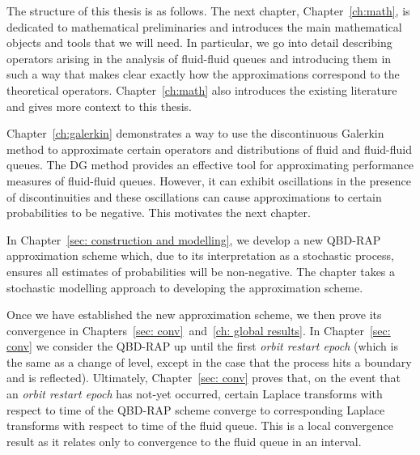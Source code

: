 The structure of this thesis is as follows. The next chapter, Chapter~\ref{ch:math}, is dedicated to mathematical preliminaries and introduces the main mathematical objects and tools that we will need. In particular, we go into detail describing operators arising in the analysis of fluid-fluid queues and introducing them in such a way that makes clear exactly how the approximations correspond to the theoretical operators. %
Chapter~\ref{ch:math} also introduces the existing literature and gives more context to this thesis.

Chapter~\ref{ch:galerkin} demonstrates a way to use the discontinuous Galerkin method to approximate certain operators and distributions of fluid and fluid-fluid queues. The DG method provides an effective tool for approximating performance measures of fluid-fluid queues. However, it can exhibit oscillations in the presence of discontinuities and these oscillations can cause approximations to certain probabilities to be negative. This motivates the next chapter.

In Chapter~\ref{sec: construction and modelling}, we develop a new QBD-RAP approximation scheme which, due to its interpretation as a stochastic process, ensures all estimates of probabilities will be non-negative. The chapter takes a stochastic modelling approach to developing the approximation scheme. 

Once we have established the new approximation scheme, we then prove its convergence in Chapters~\ref{sec: conv}~and~\ref{ch: global results}. In Chapter~\ref{sec: conv} we consider the QBD-RAP up until the first \emph{orbit restart epoch} (which is the same as a change of level, except in the case that the process hits a boundary and is reflected). Ultimately, Chapter~\ref{sec: conv} proves that, on the event that an \emph{orbit restart epoch} has not-yet occurred, certain Laplace transforms with respect to time of the QBD-RAP scheme converge to corresponding Laplace transforms with respect to time of the fluid queue. This is a local convergence result as it relates only to convergence to the fluid queue in an interval. 

